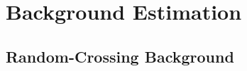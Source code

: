 \chapter{Background Estimation}
\label{chap:bkg}

\section{Random-Crossing Background}
\label{sec:bkg:random}

